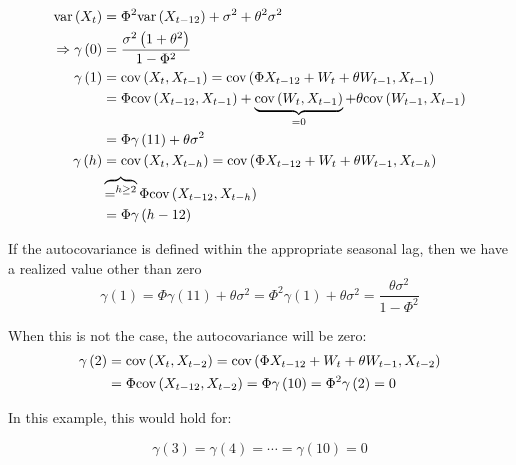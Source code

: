 \documentclass[]{book}
\theoremstyle{definition}
\theoremstyle{definition}
\theoremstyle{definition}
\theoremstyle{remark}
\begin{document}
{\begin{align}
\text{var} \left( {{X_t}} \right) &= {\Phi ^2}\text{var} \left( {{X_{t - 12}}} \right) + {\sigma ^2} + {\theta ^2}{\sigma ^2} \notag \\
\Rightarrow \gamma \left( 0 \right) &= \frac{{{\sigma ^2}\left( {1 + {\theta ^2}} \right)}}{{1 - {\Phi ^2}}} \\
  \gamma \left( 1 \right) &= \text{cov}\left( {{X_t},{X_{t - 1}}} \right) = \text{cov}\left( {\Phi {X_{t - 12}} + {W_t} + \theta {W_{t - 1}},{X_{t - 1}}} \right) \notag \\
   &= \Phi \text{cov}\left( {{X_{t - 12}},{X_{t - 1}}} \right) + \underbrace {\text{cov}\left( {{W_t},{X_{t - 1}}} \right)}_{ = 0} + \theta \text{cov}\left( {{W_{t - 1}},{X_{t - 1}}} \right) \notag  \\
   &= \Phi \gamma \left( {11} \right) + \theta {\sigma ^2} \\
  \gamma \left( h \right) &= \text{cov}\left( {{X_t},{X_{t - h}}} \right) = \text{cov}\left( {\Phi {X_{t - 12}} + {W_t} + \theta {W_{t - 1}},{X_{t - h}}} \right) \notag \\
  &\overbrace{=^{h \ge 2}}\Phi \text{cov}\left( {{X_{t - 12}},{X_{t - h}}} \right) \notag \\
   &= \Phi \gamma \left( {h - 12} \right) \\
\end{align}

If the autocovariance is defined within the appropriate seasonal lag,
then we have a realized value other than zero \begin{equation}
 \gamma \left( 1 \right) = \Phi \gamma \left( {11} \right) + \theta {\sigma ^2} = {\Phi ^2}\gamma \left( 1 \right) + \theta {\sigma ^2} = \frac{{\theta {\sigma ^2}}}{{1 - {\Phi ^2}}}
\end{equation}

When this is not the case, the autocovariance will be zero:
\begin{align}
  \gamma \left( 2 \right) &= \text{cov} \left( {{X_t},{X_{t - 2}}} \right) = \operatorname{cov} \left( {\Phi {X_{t - 12}} + {W_t} + \theta {W_{t - 1}},{X_{t - 2}}} \right) \notag \\
   &= \Phi \text{cov} \left( {{X_{t - 12}},{X_{t - 2}}} \right) = \Phi \gamma \left( {10} \right) = {\Phi ^2}\gamma \left( 2 \right) = 0 
\end{align}

In this example, this would hold for:

\begin{equation}
\gamma \left( 3 \right) = \gamma \left( 4 \right) = \cdots = \gamma \left( 10 \right) = 0
\end{equation}

}
\end{document}
